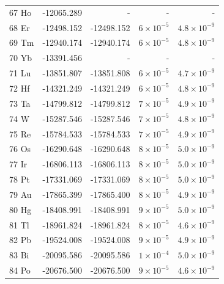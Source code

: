 \begin{longtable}{l r r r r}
67 Ho       &   -12065.289        & -                 &    -                    &    -                    \\
68 Er       &   -12498.152        & -12498.152        &   $6\times10^{-5}$      &   $4.8\times10^{-9}$    \\
69 Tm       &   -12940.174        & -12940.174        &   $6\times10^{-5}$      &   $4.8\times10^{-9}$    \\
70 Yb       &   -13391.456        & -                 &    -                    &    -                    \\
71 Lu       &   -13851.807        & -13851.808        &   $6\times10^{-5}$      &   $4.7\times10^{-9}$    \\
72 Hf       &   -14321.249        & -14321.249        &   $6\times10^{-5}$      &   $4.8\times10^{-9}$    \\
73 Ta       &   -14799.812        & -14799.812        &   $7\times10^{-5}$      &   $4.9\times10^{-9}$    \\
74 W        &   -15287.546        & -15287.546        &   $7\times10^{-5}$      &   $4.8\times10^{-9}$    \\
75 Re       &   -15784.533        & -15784.533        &   $7\times10^{-5}$      &   $4.9\times10^{-9}$    \\
76 Os       &   -16290.648        & -16290.648        &   $8\times10^{-5}$      &   $5.0\times10^{-9}$    \\
77 Ir       &   -16806.113        & -16806.113        &   $8\times10^{-5}$      &   $5.0\times10^{-9}$    \\
78 Pt       &   -17331.069        & -17331.069        &   $8\times10^{-5}$      &   $5.0\times10^{-9}$    \\
79 Au       &   -17865.399        & -17865.400        &   $8\times10^{-5}$      &   $4.9\times10^{-9}$    \\
80 Hg       &   -18408.991        & -18408.991        &   $9\times10^{-5}$      &   $5.0\times10^{-9}$    \\
81 Tl       &   -18961.824        & -18961.824        &   $8\times10^{-5}$      &   $4.6\times10^{-9}$    \\
82 Pb       &   -19524.008        & -19524.008        &   $9\times10^{-5}$      &   $4.9\times10^{-9}$    \\
83 Bi       &   -20095.586        & -20095.586        &   $1\times10^{-4}$      &   $5.0\times10^{-9}$    \\
84 Po       &   -20676.500        & -20676.500        &   $9\times10^{-5}$      &   $4.6\times10^{-9}$    \\

\end{longtable}
